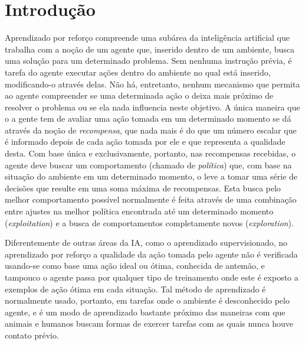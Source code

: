 \documentclass[cic,tc]{iiufrgs}
\begin{document}

\tableofcontents

\chapter{Introdução}
Aprendizado por reforço compreende uma subárea da inteligência artificial que
trabalha com a noção de um agente que, inserido dentro de um ambiente, busca uma
solução para um determinado problema. Sem nenhuma instrução prévia, é tarefa do
agente executar ações dentro do ambiente no qual está inserido, modificando-o
através delas. Não há, entretanto, nenhum mecanismo que permita ao agente
compreender se uma determinada ação o deixa mais próximo de resolver o problema
ou se ela nada influencia neste objetivo. A única maneira que o a gente tem de
avaliar uma ação tomada em um determinado momento se dá através da noção de
\textit{recompensa}, que nada mais é do que um número escalar que é informado
depois de cada ação tomada por ele e que representa a qualidade desta. Com base
única e exclusivamente, portanto, nas recompensas recebidas, o agente deve
buscar um comportamento (chamado de \textit{política}) que, com base na situação
do ambiente em um determinado momento, o leve a tomar uma série de decisões que
resulte em uma soma máxima de recompensas. Esta busca pelo melhor comportamento
possível normalmente é feita através de uma combinação entre ajustes na melhor
política encontrada até um determinado momento (\textit{exploitation}) e a busca
de comportamentos completamente novos (\textit{exploration}).

Diferentemente de outras áreas da IA, como o aprendizado supervisionado, no
aprendizado por reforço a qualidade da ação tomada pelo agente não é verificada
usando-se como base uma ação ideal ou ótima, conhecida de antemão, e tampouco o
agente passa por qualquer tipo de treinamento onde este é exposto a exemplos de
ação ótima em cada situação. Tal método de aprendizado é normalmente usado,
portanto, em tarefas onde o ambiente é desconhecido pelo agente, e é um modo de
aprendizado bastante próximo das maneiras com que animais e humanos buscam
formas de exercer tarefas com as quais nunca houve contato prévio.
\end{document}

